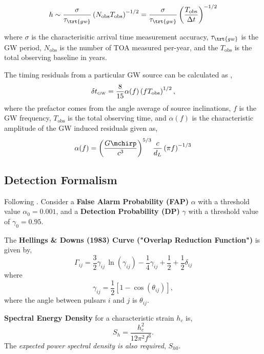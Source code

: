 \documentclass[10pt, oneside, onecolumn]{article}   	%
\newcommand{\tgw}{\tau_\trt{gw}}
\begin{document}
    \begin{equation}
    h \sim \frac{\sigma}{\tgw} \left( N_\mathrm{obs} T_\mathrm{obs} \right)^{-1/2} = \frac{\sigma}{\tgw} \left( \frac{T_\mathrm{obs}}{\Delta t} \right)^{-1/2}
    \end{equation}

    where $\sigma$ is the characterisitic arrival time measurement accuracy, $\tgw$ is the GW period, $N_\mathrm{obs}$ is the number of TOA measured per-year, and the $T_\mathrm{obs}$ is the total observing baseline in years.

    The timing residuals from a particular GW source can be calculated as \citep[][Eq.~20]{sesana2009},
    \begin{equation}
    \delta t_\textrm{\tiny GW} = \frac{8}{15} \alpha(f) \left(f T_\textrm{obs}\right)^{1/2},
    \end{equation}
    where the prefactor comes from the angle average of source inclinations, $f$ is the GW frequency, $T_\textrm{obs}$ is the total observing time, and $\alpha(f)$ is the characteristic amplitude of the GW induced residuals given as,
    \begin{equation}
    \alpha(f) = \left(\frac{G \mchirp}{c^3}\right)^{5/3} \frac{c}{d_L} \left( \pi f \right)^{-1/3}
    \end{equation}

    \subsection{Detection Formalism}
    Following \citep{rosado2015}.  Consider a \textbf{False Alarm Probability (FAP)} $\alpha$ with a threshold value $\alpha_0 = 0.001$, and a \textbf{Detection Probability (DP)} $\gamma$ with a threshold value of $\gamma_0 = 0.95$.

    The \textbf{Hellings \& Downs (1983) Curve ("Overlap Reduction Function")} is given by,
    \begin{equation}
    \Gamma_{ij} = \frac{3}{2} \gamma_{ij} \, \ln \left(\gamma_{ij}\right) - \frac{1}{4}\gamma_{ij} + \frac{1}{2} + \frac{1}{2}\delta_{ij}
    \end{equation}
    where
    \begin{equation}
    \gamma_{ij} = \frac{1}{2}\left[1 - \cos(\theta_{ij})\right],
    \end{equation}
    where the angle between pulsars $i$ and $j$ is $\theta_{ij}$.

    \textbf{Spectral Energy Density} for a characteristic strain $h_c$ is,
    \begin{equation}
    S_h = \frac{h_c^2}{12 \pi^2 f^3}.
    \end{equation}
    The \textit{expected power spectral density is also required}, $S_{h0}$.
\end{document}
